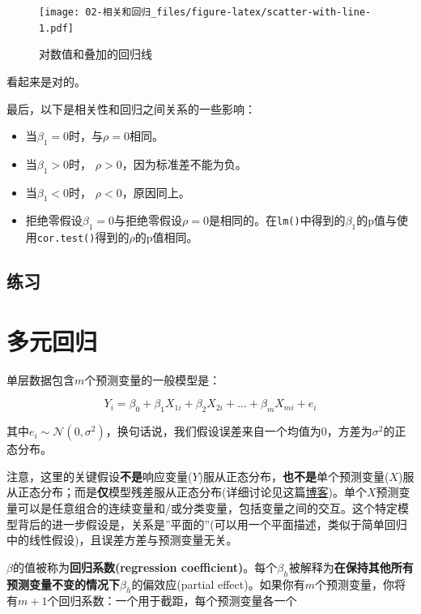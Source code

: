 \documentclass[
]{book}
\providecommand{\tightlist}{%
  \setlength{\itemsep}{0pt}\setlength{\parskip}{0pt}}
\begin{document}
\begin{figure}
\centering
\texttt{[image: 02-相关和回归\_files/figure-latex/scatter-with-line-1.pdf]}
\caption{\label{fig:scatter-with-line}对数值和叠加的回归线}
\end{figure}

看起来是对的。

最后，以下是相关性和回归之间关系的一些影响：

\begin{itemize}
\tightlist
\item
  当\(\beta_1 = 0\)时，与\(\rho = 0\)相同。
\item
  当\(\beta_1 > 0\)时， \(\rho > 0\)，因为标准差不能为负。
\item
  当\(\beta_1 < 0\)时， \(\rho < 0\)，原因同上。
\item
  拒绝零假设\(\beta_1 = 0\)与拒绝零假设\(\rho = 0\)是相同的。在\texttt{lm()}中得到的\(\beta_1\)的p值与使用\texttt{cor.test()}得到的\(\rho\)的p值相同。
\end{itemize}

\hypertarget{ux7ec3ux4e60}{%
\section{练习}\label{ux7ec3ux4e60}}

\hypertarget{ux591aux5143ux56deux5f52}{%
\chapter{多元回归}\label{ux591aux5143ux56deux5f52}}

单层数据包含\(m\)个预测变量的一般模型是：

\[
Y_i = \beta_0 + \beta_1 X_{1i} + \beta_2 X_{2i} + \ldots + \beta_m X_{mi} + e_i
\]

其中\(e_i \sim \mathcal{N}\left(0, \sigma^2\right)\)，换句话说，我们假设误差来自一个均值为0，方差为\(\sigma^2\)的正态分布。

注意，这里的关键假设\textbf{不是}响应变量(\(Y\))服从正态分布，\textbf{也不是}单个预测变量(\(X\))服从正态分布；而是\textbf{仅}模型残差服从正态分布(详细讨论见这篇\href{https://datahowler.wordpress.com/2018/08/04/checking-model-assumptions-look-at-the-residuals-not-the-raw-data/}{博客})。单个\(X\)预测变量可以是任意组合的连续变量和/或分类变量，包括变量之间的交互。这个特定模型背后的进一步假设是，关系是''平面的''(可以用一个平面描述，类似于简单回归中的线性假设)，且误差方差与预测变量无关。

\(\beta\)的值被称为\textbf{回归系数(regression coefficient)}。每个\(\beta_h\)被解释为\textbf{在保持其他所有预测变量不变的情况下}\(\beta_h\)的偏效应(partial effect)。如果你有\(m\)个预测变量，你将有\(m+1\)个回归系数：一个用于截距，每个预测变量各一个
\end{document}
